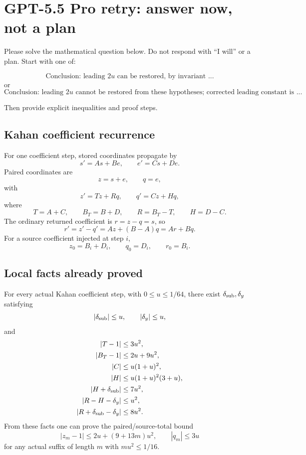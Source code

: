 \documentclass{article}
\begin{document}
\section*{GPT-5.5 Pro retry: answer now, not a plan}

Please solve the mathematical question below.  Do not respond with ``I will''
or a plan.  Start with one of:

\[
\text{Conclusion: leading }2u\text{ can be restored, by invariant ...}
\]
or
\[
\text{Conclusion: leading }2u\text{ cannot be restored from these hypotheses; corrected leading constant is ...}
\]

Then provide explicit inequalities and proof steps.

\subsection*{Kahan coefficient recurrence}

For one coefficient step, stored coordinates propagate by
\[
  s' = A s + B e,\qquad e' = C s + D e.
\]
Paired coordinates are
\[
  z=s+e,\qquad q=e,
\]
with
\[
  z'=Tz+Rq,\qquad q'=Cz+Hq,
\]
where
\[
  T=A+C,\qquad B_T=B+D,\qquad R=B_T-T,\qquad H=D-C.
\]
The ordinary returned coefficient is \(r=z-q=s\), so
\[
  r'=z'-q'=A z+(B-A)q=A r+Bq.
\]
For a source coefficient injected at step \(i\),
\[
  z_0=B_i+D_i,\qquad q_0=D_i,\qquad r_0=B_i.
\]

\subsection*{Local facts already proved}

For every actual Kahan coefficient step, with \(0\le u\le 1/64\), there exist
\(\delta_{\rm sub},\delta_y\) satisfying
\[
  |\delta_{\rm sub}|\le u,\qquad |\delta_y|\le u,
\]
and
\[
\begin{aligned}
  |T-1| &\le 3u^2,\\
  |B_T-1| &\le 2u+9u^2,\\
  |C| &\le u(1+u)^2,\\
  |H| &\le u(1+u)^2(3+u),\\
  |H+\delta_{\rm sub}| &\le 7u^2,\\
  |R-H-\delta_y| &\le u^2,\\
  |R+\delta_{\rm sub}-\delta_y| &\le 8u^2.
\end{aligned}
\]
From these facts one can prove the paired/source-total bound
\[
  |z_m-1|\le 2u+(9+13m)u^2,\qquad |q_m|\le 3u
\]
for any actual suffix of length \(m\) with \(mu^2\le 1/16\).
\end{document}
